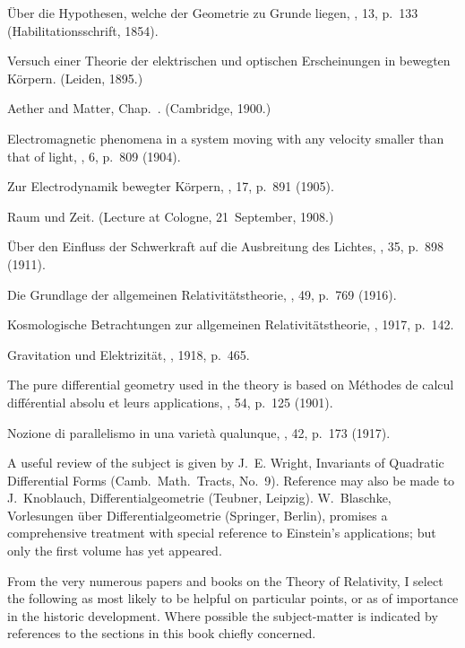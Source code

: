 \documentclass[12pt]{book}
\begin{document}
 Über die Hypothesen, welche der Geometrie zu Grunde liegen, , 13, p.~133 (Habilitationsschrift, 1854).

 Versuch einer Theorie der elektrischen und optischen Erscheinungen in
bewegten Körpern. (Leiden, 1895.)

 Aether and Matter, Chap.~. (Cambridge, 1900.)

 Electromagnetic phenomena in a system moving with any velocity smaller
than that of light, , 6, p.~809 (1904).

 Zur Electrodynamik bewegter Körpern, , 17, p.~891 (1905).

 Raum und Zeit. (Lecture at Cologne, 21~September, 1908.)

 Über den Einfluss der Schwerkraft auf die Ausbreitung des Lichtes, , 35, p.~898 (1911).

 Die Grundlage der allgemeinen Relativitätstheorie, , 49, p.~769
(1916).

 Kosmologische Betrachtungen zur allgemeinen Relativitätstheorie, , 1917, p.~142.

 Gravitation und Elektrizität, , 1918, p.~465.
\medskip

The pure differential geometry used in the theory is based on
 Méthodes de calcul différential absolu et leurs
applications, \Title{Math.\ Ann.}, 54, p.~125 (1901).

 Nozione di parallelismo in una varietà qualunque, , 42, p.~173 (1917).
\medskip

A useful review of the subject is given by J.~E. Wright, Invariants of Quadratic Differential
Forms (Camb.\ Math.\ Tracts, No.~9). Reference may also be made to J.~Knoblauch,
Differentialgeometrie (Teubner, Leipzig). W.~Blaschke, Vorlesungen über Differentialgeometrie
(Springer, Berlin), promises a comprehensive treatment with special reference
to Einstein's applications; but only the first volume has yet appeared.
\medskip

From the very numerous papers and books on the Theory of Relativity, I select the
following as most likely to be helpful on particular points, or as of importance in the historic
development. Where possible the subject-matter is indicated by references to the sections
in this book chiefly concerned.
\end{document}
